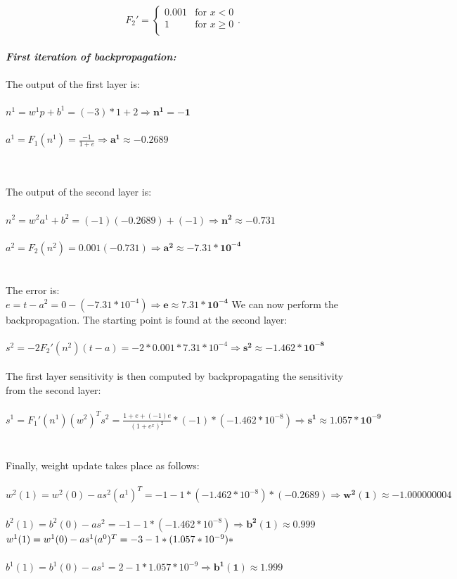 \documentclass{article}
\begin{document}
\[ F_2' = \begin{cases}
  0.001 & \text{for } x < 0 \\
  1 & \text{for } x \geq 0 \\
\end{cases}. \]\\

\noindent \textbf{\textit{First iteration of backpropagation:}}
\noindent \\ \\The output of the first layer is: \\ \\$n^1 = w^1p + b^1 = (-3)*1 + 2 \Rightarrow \bm{n^1 = -1}$
\\ \\$a^1 = F_1(n^1) = \frac{-1}{1+e} \Rightarrow \bm{a^1 \approx -0.2689}$

\noindent \\ \\The output of the second layer is: \\ \\$n^2 = w^2a^1 + b^2 = (-1)(-0.2689) + (-1) \Rightarrow \bm{n^2 \approx -0.731}$
\\ \\$a^2 = F_2(n^2) = 0.001(-0.731) \Rightarrow \bm{a^2 \approx -7.31 * 10^{-4}}$
\\ \\ \\The error is: \\$e = t - a^2 = 0 - (-7.31 * 10^{-4}) \Rightarrow \bm{e \approx 7.31 * 10^{-4}}$ 
\newpage 
\noindent We can now perform the backpropagation. The starting point is found at the second layer: \\ \\
$s^2 = -2F_2'(n^2)(t-a) = -2 * 0.001 * 7.31 * 10^{-4} \Rightarrow \bm{s^2 \approx -1.462 * 10^{-8}}$
\\\\ The first layer sensitivity is then computed by backpropagating the sensitivity from the second layer: \\ \\ $s^1 = F_1'(n^1)(w^2)^Ts^2 = \frac{1+e+(-1)e}{(1+e^x)^2} * (-1) *(-1.462 * 10^{-8}) \Rightarrow \bm{s^1 \approx 1.057 * 10^{-9}}$
\\\\ \\Finally, weight update takes place as follows: \\\\
$w^2(1) = w^2(0) - as^2(a^1)^T = -1 -1 * (-1.462 * 10 ^{-8}) * (-0.2689) \Rightarrow \bm{w^2(1) \approx -1.000000004}$
\\ \\ $b^2(1) = b^2(0) -as^2 = -1 -1 * (-1.462 * 10 ^ {-8}) \Rightarrow \bm{b^2(1) \approx 0.999}$
$\\ \\ \\ w^1(1) = w^1(0) -as^1(a^0)^T = -3 -1 * (1.057 * 10^{-9}) * $ 
\\ \\$b^1(1) = b^1(0) - as^1 = 2 - 1 * 1.057 * 10^{-9} \Rightarrow \bm{b^1(1) \approx 1.999}$\\ 
\end{document}
